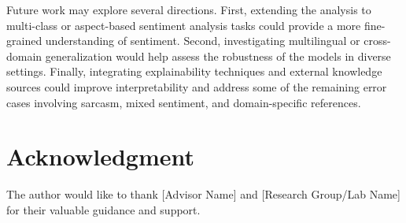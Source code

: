 \documentclass[conference]{IEEEtran}
\begin{document}
Future work may explore several directions. First, extending the analysis to multi-class or aspect-based sentiment analysis tasks could provide a more fine-grained understanding of sentiment. Second, investigating multilingual or cross-domain generalization would help assess the robustness of the models in diverse settings. Finally, integrating explainability techniques and external knowledge sources could improve interpretability and address some of the remaining error cases involving sarcasm, mixed sentiment, and domain-specific references.

\section*{Acknowledgment}
The author would like to thank [Advisor Name] and [Research Group/Lab Name] for their valuable guidance and support.
\end{document}
